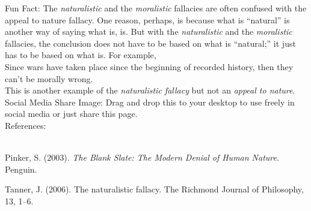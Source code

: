 \documentclass[a4paper,12pt,single,pdftex]{scrbook}
\begin{document}
{      
        Fun Fact: The {\it naturalistic} and the {\it moralistic}  fallacies are often confused with the appeal to nature fallacy. One reason, perhaps, is because what is “natural” is another way of saying what is, is. But with the {\it naturalistic} and the {\it moralistic}  fallacies, the conclusion does not have to be based on what is “natural;” it just has to be based on what is. For example,
      \\

      
        Since wars have taken place since the beginning of recorded history, then they can’t be morally wrong.
      \\

      
        This is another example of the {\it naturalistic fallacy} but not an {\it appeal to nature}.
      \\

      
        Social Media Share Image: Drag and drop this to your desktop to use freely in social media or just share this page.
      \\

    
    References:

    
      
        
      \\

      
        
          Pinker, S. (2003). {\it The Blank Slate: The Modern Denial of Human Nature}. Penguin.
        
        
          Tanner, J. (2006). The naturalistic fallacy. The Richmond Journal of Philosophy, 13, 1–6.
        
      
    
  }
\end{document}
